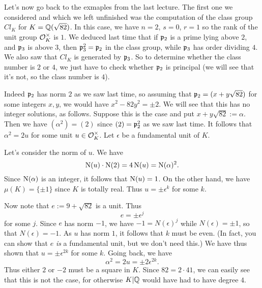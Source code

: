 Let's now go back to the exmaples from the last lecture.
The first one we considered and which we left unfinished was the computation of the class group $Cl_{K}$ for $K = \mathbb{Q}(\sqrt{82})$.
In this case, we have $n = 2$, $s = 0$, $r = 1$ so the rank of the unit group $\mathcal{O}_{K}^{\times}$ is $1$.
We deduced last time that if $\mathfrak{p}_{2}$ is a prime lying above $2$, and $\mathfrak{p}_{3}$ is above $3$, then $\mathfrak{p}_{3}^{2} = \mathfrak{p}_{2}$ in the class group, while $\mathfrak{p}_{3}$ has order dividing $4$.
We also saw that $Cl_{K}$ is generated by $\mathfrak{p}_{3}$.
So to determine whether the class number is $2$ or $4$, we just have to check whether $\mathfrak{p}_{2}$ is principal (we will see that it's not, so the class number is $4$).

Indeed $\mathfrak{p}_{2}$ has norm $2$ as we saw last time, so assuming that $\mathfrak{p}_{2} = (x + y\sqrt{82})$ for some integers $x,y$, we would have $x^{2} - 82y^{2} = \pm 2$.
We will see that this has no integer solutions, as follows.
Suppose this is the case and put $x + y \sqrt{82} := \alpha$.
Then we have $(\alpha^{2}) = (2)$ since $(2) = \mathfrak{p}_{2}^{2}$ as we saw last time.
It follows that $\alpha^{2} = 2u$ for some unit $u \in \mathcal{O}_{K}^{\times}$.
Let $\epsilon$ be a fundamental unit of $K$.

Let's consider the norm of $u$.
We have
\[ \operatorname{N}(u) \cdot \operatorname{N}(2) = 4 \operatorname{N}(u) = \operatorname{N}(\alpha)^{2}. \]
Since $\operatorname{N}(\alpha)$ is an integer, it follows that $\operatorname{N}(u) = 1$.
On the other hand, we have $\mu(K) = \{\pm 1\}$ since $K$ is totally real.
Thus $u = \pm \epsilon^{k}$ for some $k$.

Now note that $e := 9 + \sqrt{82}$ is a unit.
Thus
\[ e = \pm \epsilon^{j} \]
for some $j$.
Since $e$ has norm $-1$, we have $-1 = N(\epsilon)^{j}$ while $N(\epsilon) = \pm 1$, so that $N(\epsilon) = -1$.
As $u$ has norm $1$, it follows that $k$ must be even.
(In fact, you can show that $e$ \emph{is} a fundamental unit, but we don't need this.)
We have thus shown that $u = \pm \epsilon^{2k}$ for some $k$.
Going back, we have
\[ \alpha^{2} = 2u = \pm 2\epsilon^{2k}. \]
Thus either $2$ or $-2$ must be a square in $K$.
Since $82 = 2 \cdot 41$, we can easily see that this is not the case, for otherwise $K|\mathbb{Q}$ would have had to have degree $4$.

